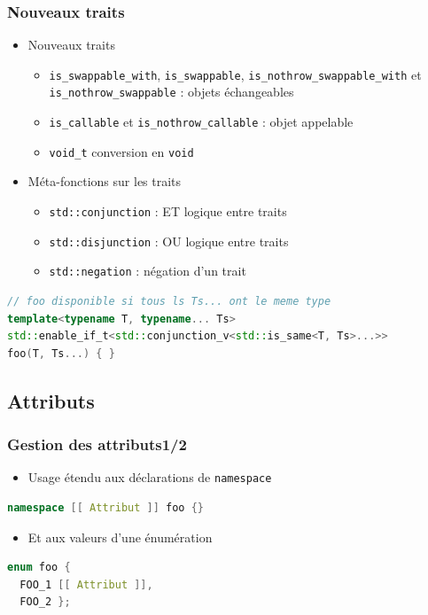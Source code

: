 \documentclass[C++.tex]{subfiles}
\begin{document}
\begin{frame}[fragile]
	\frametitle{Nouveaux traits}
	\begin{itemize}
		\item Nouveaux traits
		\begin{itemize}
			\item \lstinline|is_swappable_with|, \lstinline|is_swappable|, \lstinline|is_nothrow_swappable_with| et \lstinline|is_nothrow_swappable| : objets échangeables
			\item \lstinline|is_callable| et \lstinline|is_nothrow_callable| : objet appelable
			\item \lstinline|void_t| conversion en \lstinline|void|


		\end{itemize}
		\item Méta-fonctions sur les traits
		\begin{itemize}
			\item \lstinline|std::conjunction| : \og ET\fg{} logique entre traits
			\item \lstinline|std::disjunction| : \og OU\fg{} logique entre traits
			\item \lstinline|std::negation| : négation d'un trait
		\end{itemize}
	\end{itemize}

	\begin{lstlisting}[language=C++]
// foo disponible si tous ls Ts... ont le meme type
template<typename T, typename... Ts>
std::enable_if_t<std::conjunction_v<std::is_same<T, Ts>...>>
foo(T, Ts...) { }\end{lstlisting}
\end{frame}

\subsection*{Attributs}
\begin{frame}[fragile]
	\frametitle{Gestion des attributs\titlehfill{}1/2}
	\begin{itemize}
		\item Usage étendu aux déclarations de \lstinline|namespace|
	\end{itemize}

	\begin{lstlisting}[language=C++]
namespace [[ Attribut ]] foo {}\end{lstlisting}

	\begin{itemize}
		\item Et aux valeurs d'une énumération
	\end{itemize}

	\begin{lstlisting}[language=C++]
enum foo {
  FOO_1 [[ Attribut ]],
  FOO_2 };\end{lstlisting}
\end{frame}
\end{document}
